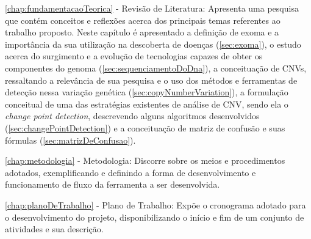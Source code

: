 \autoref{chap:fundamentacaoTeorica} - Revisão de Literatura: Apresenta uma pesquisa que contém conceitos e reflexões acerca dos principais temas referentes ao trabalho proposto. Neste capítulo é apresentado a definição de exoma e a importância da sua utilização na descoberta de doenças (\autoref{sec:exoma}), o estudo acerca do surgimento e a evolução de tecnologias capazes de obter os componentes do genoma (\autoref{sec:sequenciamentoDoDna}), a conceituação de CNVs, ressaltando a relevância de sua pesquisa e o uso dos métodos e ferramentas de detecção nessa variação genética (\autoref{sec:copyNumberVariation}), a formulação conceitual de uma das estratégias existentes de análise de CNV, sendo ela o \textit{change point detection}, descrevendo alguns algoritmos desenvolvidos (\autoref{sec:changePointDetection}) e a conceituação de matriz de confusão e suas fórmulas (\autoref{sec:matrizDeConfusao}).

\autoref{chap:metodologia} - Metodologia: Discorre sobre os meios e procedimentos adotados, exemplificando e definindo a forma de desenvolvimento e funcionamento de fluxo da ferramenta a ser desenvolvida.

\autoref{chap:planoDeTrabalho} - Plano de Trabalho: Expõe o cronograma adotado para o desenvolvimento do projeto, disponibilizando o início e fim de um conjunto de atividades e sua descrição.

